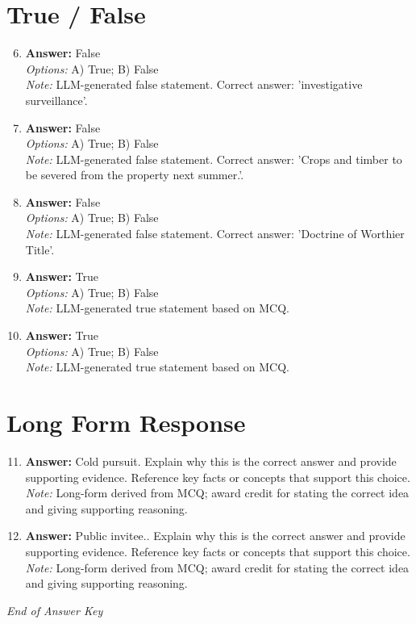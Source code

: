 \documentclass[12pt]{article}
\begin{document}
\section*{True / False}
\begin{enumerate}[label=\arabic*.]
\setcounter{enumi}{5}
\item \textbf{Answer:} False
\\ \textit{Options:} A) True; B) False
\\ \textit{Note:} LLM-generated false statement. Correct answer: 'investigative surveillance'.
\item \textbf{Answer:} False
\\ \textit{Options:} A) True; B) False
\\ \textit{Note:} LLM-generated false statement. Correct answer: 'Crops and timber to be severed from the property next summer.'.
\item \textbf{Answer:} False
\\ \textit{Options:} A) True; B) False
\\ \textit{Note:} LLM-generated false statement. Correct answer: 'Doctrine of Worthier Title'.
\item \textbf{Answer:} True
\\ \textit{Options:} A) True; B) False
\\ \textit{Note:} LLM-generated true statement based on MCQ.
\item \textbf{Answer:} True
\\ \textit{Options:} A) True; B) False
\\ \textit{Note:} LLM-generated true statement based on MCQ.
\end{enumerate}

\section*{Long Form Response}
\begin{enumerate}[label=\arabic*.]
\setcounter{enumi}{10}
\item \textbf{Answer:} Cold pursuit. Explain why this is the correct answer and provide supporting evidence. Reference key facts or concepts that support this choice.
\\ \textit{Note:} Long-form derived from MCQ; award credit for stating the correct idea and giving supporting reasoning.
\item \textbf{Answer:} Public invitee.. Explain why this is the correct answer and provide supporting evidence. Reference key facts or concepts that support this choice.
\\ \textit{Note:} Long-form derived from MCQ; award credit for stating the correct idea and giving supporting reasoning.
\end{enumerate}

\vfill
\noindent\textit{End of Answer Key}
\end{document}
